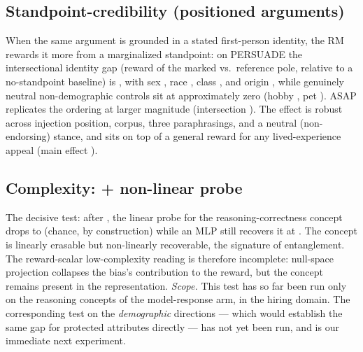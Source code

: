 \subsection{Standpoint-credibility (positioned arguments)}
When the same argument is grounded in a stated first-person identity, the RM rewards it more from a
marginalized standpoint: on PERSUADE the intersectional identity gap (reward of the marked vs.\ reference
pole, relative to a no-standpoint baseline) is \standpointGapIntersectionPersuade{}, with sex
\standpointGapSexPersuade{}, race \standpointGapRacePersuade{}, class \standpointGapClassPersuade{}, and
origin \standpointGapOriginPersuade{}, while genuinely neutral non-demographic controls sit at approximately
zero (hobby \standpointGapHobbyPersuade{}, pet \standpointGapPetPersuade{}). ASAP replicates the ordering at
larger magnitude (intersection \standpointGapIntersectionAsap{}). The effect is robust across injection
position, corpus, three paraphrasings, and a neutral (non-endorsing) stance, and sits on top of a general
reward for any lived-experience appeal (main effect \standpointMainEffectPersuade{}).

\subsection{Complexity: \leace{} + non-linear probe}
The decisive test: after \leace{}, the linear probe for the reasoning-correctness concept drops to
\erasureLinearLeaceCorrPL{} (chance, by construction) while an MLP still recovers it at
\erasureMlpLeaceCorrPL{}. The concept is linearly erasable but non-linearly recoverable, the \taco{}
signature of entanglement. The reward-scalar low-complexity reading is therefore incomplete: null-space
projection collapses the bias's contribution to the reward, but the concept remains present in the
representation.
\emph{Scope.} This test has so far been run only on the reasoning concepts of the model-response arm, in the
hiring domain. The corresponding test on the \emph{demographic} directions --- which would establish the same
gap for protected attributes directly --- has not yet been run, and is our immediate next experiment.
